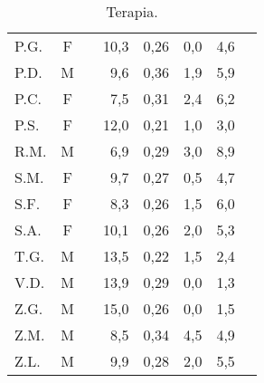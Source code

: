 \begin{table}[!h]
\begin{center}
\begin{tabular}{lccrcccl}
P.G.	& F & \checkmark & 10,3  	&  0,26     	& 0,0                 & 4,6  \\
P.D.	& M &  		 & 9,6   	&  0,36     	& 1,9                 & 5,9  \\
P.C.	& F &  		 & 7,5   	&  0,31     	& 2,4                 & 6,2  \\
P.S.	& F &  		 & 12,0  	&  0,21     	& 1,0                 & 3,0  \\
R.M.	& M & \checkmark & 6,9   	&  0,29     	& 3,0                 & 8,9  \\
S.M.	& F &  	  	 & 9,7   	&  0,27     	& 0,5                 & 4,7  \\
S.F.	& F &  		 & 8,3   	&  0,26     	& 1,5                 & 6,0  \\
S.A.	& F &  		 & 10,1  	&  0,26     	& 2,0                 & 5,3  \\
T.G.    & M &            & 13,5         &  0,22         & 1,5                 & 2,4  \\
V.D.	& M &  		 & 13,9  	&  0,29     	& 0,0                 & 1,3  \\
Z.G.	& M &  		 & 15,0  	&  0,26     	& 0,0                 & 1,5  \\
Z.M.	& M &  		 & 8,5   	&  0,34     	& 4,5                 & 4,9  \\
Z.L.	& M &  		 & 9,9   	&  0,28     	& 2,0                 & 5,5  \\
\bottomrule
\end{tabular}
\end{center}
\caption{Terapia.}
\label{tab:Terapia}
\end{table}


